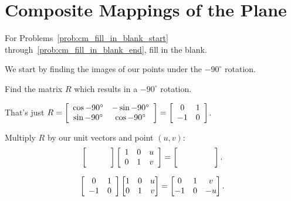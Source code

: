 \documentclass[../key.tex]{subfiles}
\begin{document}
\section{Composite Mappings of the Plane}

\newcommand{\blanktwomat}{\twomat{\phantom{0}}{\phantom{0}}{}{}}

\begin{outer_problem}[start=1]
\item For Problems~\ref{prob:cm_fill_in_blank_start} through~\ref{prob:cm_fill_in_blank_end}, fill in the blank.
\end{outer_problem}

\begin{inner_problem}[start=1]
\item We start by finding the images of our points under the $-90^\circ$ rotation. \label{prob:cm_fill_in_blank_start}
\end{inner_problem}

\begin{iinner_problem}[start=1]
\item Find the matrix $R$ which results in a $-90^\circ$ rotation.
\end{iinner_problem}

That's just $R=\left[\begin{array}{cc} \cos -90^\circ & -\sin -90^\circ \\ \sin -90^\circ & \cos -90^\circ \end{array}\right]=\left[\begin{array}{cc} 0 & 1 \\ -1 & 0 \end{array}\right]$.

\begin{iinner_problem}
\item  \label{prob:intermediate_result_matrix} Multiply $R$ by our unit vectors and point $(u,v)$: $$\blanktwomat\left[\begin{array}{ccc} 1 & 0 & u \\ 0 & 1 & v \end{array}\right] = \left[\phantom{\begin{array}{ccc} 1 & 0 & u \\ 0 & 1 & v \end{array}}\right].$$
\end{iinner_problem}

$$\left[\begin{array}{cc} 0 & 1 \\ -1 & 0 \end{array}\right]\begin{bmatrix} 1 & 0 & u \\ 0 & 1 & v \end{bmatrix} = \begin{bmatrix}0 & 1 & v \\ -1 & 0 & -u \\ \end{bmatrix}.$$
\end{document}
